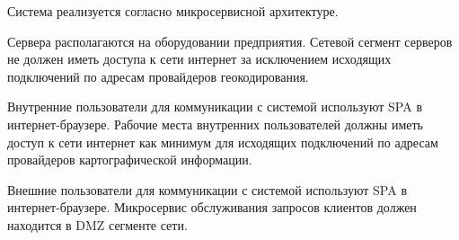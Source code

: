 Система реализуется согласно микросервисной архитектуре.

Сервера располагаются на оборудовании предприятия.
Сетевой сегмент серверов не должен иметь доступа к сети интернет за исключением исходящих подключений по адресам провайдеров геокодирования.

Внутренние пользователи для коммуникации с системой используют SPA в интернет-браузере.
Рабочие места внутренних пользователей должны иметь доступ к сети интернет как минимум для исходящих подключений по адресам провайдеров картографической информации.

Внешние пользователи для коммуникации с системой используют SPA в интернет-браузере.
Микросервис обслуживания запросов клиентов должен находится в DMZ сегменте сети.
\endinput
